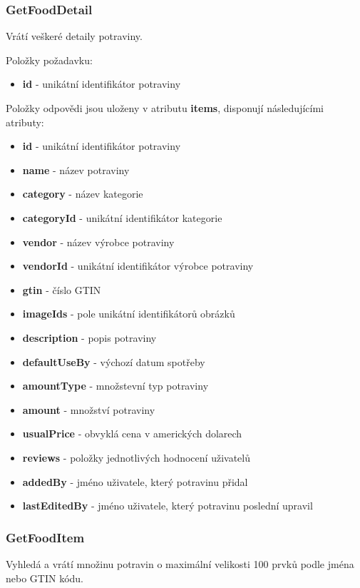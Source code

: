 \documentclass[thesis=B,czech]{FITthesis}[2013/10/20]
\begin{document}
\subsubsection{GetFoodDetail}
Vrátí veškeré detaily potraviny.

Položky požadavku:
\begin{itemize}
  \item \textbf{id} - unikátní identifikátor potraviny
\end{itemize}

Položky odpovědi jsou uloženy v atributu \textbf{items}, disponují následujícími atributy:
\begin{itemize}
  \item \textbf{id} - unikátní identifikátor potraviny
  \item \textbf{name} - název potraviny
  \item \textbf{category} - název kategorie
  \item \textbf{categoryId} - unikátní identifikátor kategorie
  \item \textbf{vendor} - název výrobce potraviny
  \item \textbf{vendorId} - unikátní identifikátor výrobce potraviny
  \item \textbf{gtin} - číslo GTIN
  \item \textbf{imageIds} - pole unikátní identifikátorů obrázků
  \item \textbf{description} - popis potraviny
  \item \textbf{defaultUseBy} - výchozí datum spotřeby
  \item \textbf{amountType} - množstevní typ potraviny
  \item \textbf{amount} - množství potraviny
  \item \textbf{usualPrice} - obvyklá cena v amerických dolarech
  \item \textbf{reviews} - položky jednotlivých hodnocení uživatelů
  \item \textbf{addedBy} - jméno uživatele, který potravinu přidal
  \item \textbf{lastEditedBy} - jméno uživatele, který potravinu poslední upravil
\end{itemize}

\subsubsection{GetFoodItem}
Vyhledá a vrátí množinu potravin o maximální velikosti 100 prvků podle jména nebo GTIN kódu.
\end{document}
